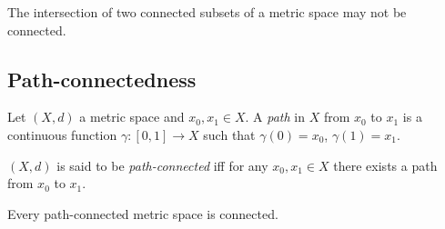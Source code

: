 \documentclass{article}
\begin{document}
\begin{lemma}
	The intersection of two connected subsets of a metric space may not be connected.
\end{lemma}

\subsection{Path-connectedness}

\begin{definition}
	Let $(X,d)$ a metric space and $x_0,x_1\in X$. A \emph{path} in $X$ from $x_0$ to $x_1$ is a
	continuous function $\gamma:[0,1]\to X$ such that $\gamma(0)=x_0$, $\gamma(1)=x_1$.

	$(X,d)$ is said to be \emph{path-connected} iff for any $x_0,x_1\in X$ there exists a path
	from $x_0$ to $x_1$.
\end{definition}

\begin{proposition}
	Every path-connected metric space is connected.
\end{proposition}
\end{document}
